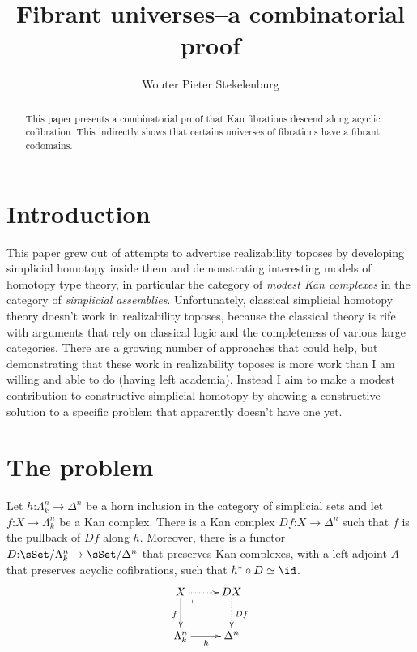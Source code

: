 \documentclass{tac}
\title{Fibrant universes--a combinatorial proof}
\author{Wouter Pieter Stekelenburg}
\makeatletter
\newcommand\hide[1]{}
\newcommand\of{\mathord:}
\newcommand\ri{^*}
\newcommand\pulled{\ar@{}[dr]|(.2)\lrcorner}
\makeatother
\begin{document}
\begin{abstract} This paper presents a combinatorial proof that Kan fibrations
  descend along acyclic cofibration. This indirectly shows that certains
  universes of fibrations have a fibrant codomains.
\end{abstract}

\maketitle

\section{Introduction}
This paper grew out of attempts to advertise realizability toposes by
developing simplicial homotopy inside them and demonstrating interesting
models of homotopy type theory, in particular the 
category of \emph{modest Kan complexes} in the category of \emph{simplicial 
assemblies}.\hide{todo: point to a point in the paper where these are explained}
Unfortunately, classical simplicial homotopy theory doesn't work in 
realizability toposes, because the classical theory is rife with arguments that 
rely on classical logic and the completeness of various large categories.
\hide{this could also do with explanation or citations} There are a growing 
number of approaches that could help,\hide{cite! Garner, Swan, Gambino, Herny, 
Stattler, Szumilo...} but demonstrating that these work in realizability 
toposes is more work than I am willing and able to do (having left academia). 
Instead I aim to make a modest contribution to constructive simplicial homotopy 
by showing a constructive solution to a specific problem that apparently doesn't
have one yet.

\section{The problem}
Let \( h\of \Lambda^n_k \to \Delta^n \) be a horn inclusion in the category of
simplicial sets and let \( f\of X\to \Lambda^n_k \) be a Kan complex. There is a
Kan complex \( Df\of X \to \Delta^n \) such that \( f \) is the pullback of \( Df \) along 
\( h \). Moreover, there is a functor \( D\of \sSet/\Lambda^n_k\to \sSet/\Delta^n \)
that preserves Kan complexes, with a left adjoint \( A \) that preserves acyclic
cofibrations, such that \( h\ri \circ D\simeq \id \).
\[\xymatrix{
X\ar[d]_f\ar@{.>}[r]\pulled & DX \ar@{.>}[d]^{Df}\\
\Lambda^n_k \ar[r]_h & \Delta^n
}\]
\hide{ 
  lots of undefined terms here\dots 

  Jaap would interupt me before the first sentence ended, but we could go over
  the context and the definitions down here, using the informal decription
  above as a guide.

  Maybe I could add a `bear with me' on top.
}
\hide{
  Functors \( D^n_k \) and \( A^n_k \)? 
}
\end{document}
